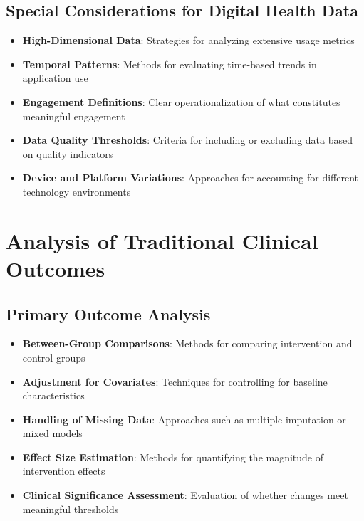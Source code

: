 \subsection{Special Considerations for Digital Health Data}
\begin{itemize}
    \item \textbf{High-Dimensional Data}: Strategies for analyzing extensive usage metrics
    
    \item \textbf{Temporal Patterns}: Methods for evaluating time-based trends in application use
    
    \item \textbf{Engagement Definitions}: Clear operationalization of what constitutes meaningful engagement
    
    \item \textbf{Data Quality Thresholds}: Criteria for including or excluding data based on quality indicators
    
    \item \textbf{Device and Platform Variations}: Approaches for accounting for different technology environments
\end{itemize}

\section{Analysis of Traditional Clinical Outcomes}
\subsection{Primary Outcome Analysis}
\begin{itemize}
    \item \textbf{Between-Group Comparisons}: Methods for comparing intervention and control groups
    
    \item \textbf{Adjustment for Covariates}: Techniques for controlling for baseline characteristics
    
    \item \textbf{Handling of Missing Data}: Approaches such as multiple imputation or mixed models
    
    \item \textbf{Effect Size Estimation}: Methods for quantifying the magnitude of intervention effects
    
    \item \textbf{Clinical Significance Assessment}: Evaluation of whether changes meet meaningful thresholds
\end{itemize}

